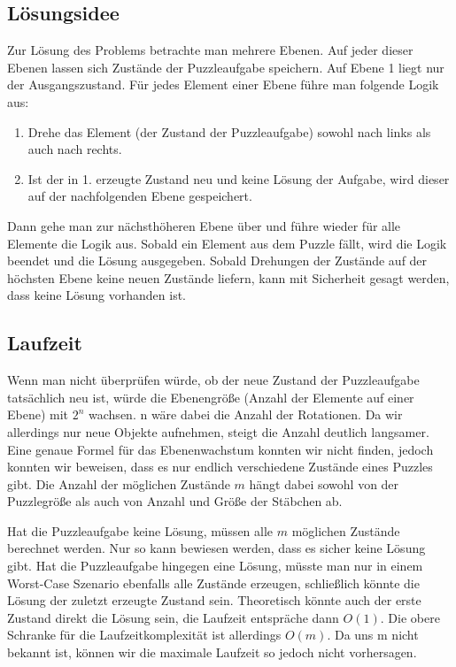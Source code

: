 \subsection {Lösungsidee}
	Zur Lösung des Problems betrachte man mehrere Ebenen. Auf jeder dieser Ebenen lassen sich Zustände der Puzzleaufgabe speichern. 
	Auf Ebene 1 liegt nur der Ausgangszustand. Für jedes Element einer Ebene führe man folgende Logik aus:

	\begin{enumerate}
		\item Drehe das Element (der Zustand der Puzzleaufgabe) sowohl nach links als auch nach rechts.
		\item Ist der in 1. erzeugte Zustand neu und keine Lösung der Aufgabe, wird dieser auf der nachfolgenden Ebene gespeichert.
	\end{enumerate}

	Dann gehe man zur nächsthöheren Ebene über und führe wieder für alle Elemente die Logik aus.
	Sobald ein Element aus dem Puzzle fällt, wird die Logik beendet und die Lösung ausgegeben. Sobald Drehungen der Zustände auf der höchsten Ebene keine neuen Zustände liefern, kann mit Sicherheit gesagt werden, dass keine Lösung vorhanden ist.
	
\subsection{Laufzeit}
	Wenn man nicht überprüfen würde, ob der neue Zustand der Puzzleaufgabe tatsächlich neu ist, würde die Ebenengröße (Anzahl der Elemente auf einer Ebene) mit \(2^n\) wachsen.  
	n wäre dabei die Anzahl der Rotationen. Da wir allerdings nur neue Objekte aufnehmen, steigt die Anzahl deutlich langsamer. 
	Eine genaue Formel für das Ebenenwachstum konnten wir nicht finden, jedoch konnten wir beweisen, dass es nur endlich verschiedene Zustände eines Puzzles gibt. Die Anzahl der möglichen Zustände \(m\) hängt dabei sowohl von der Puzzlegröße als auch von Anzahl und Größe der Stäbchen ab.

	Hat die Puzzleaufgabe keine Lösung, müssen alle \(m\) möglichen Zustände berechnet werden. Nur so kann bewiesen werden, dass es sicher keine Lösung gibt.
	Hat die Puzzleaufgabe hingegen eine Lösung, müsste man nur in einem Worst-Case Szenario ebenfalls alle Zustände erzeugen, schließlich könnte die Lösung der zuletzt erzeugte Zustand sein. Theoretisch könnte auch der erste Zustand direkt die Lösung sein, die Laufzeit entspräche dann \(O(1)\).
	Die obere Schranke für die Laufzeitkomplexität ist allerdings \(O(m)\). Da uns m nicht bekannt ist, können wir die maximale Laufzeit so jedoch nicht vorhersagen.

